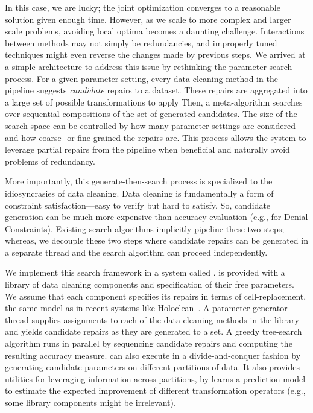 In this case, we are lucky; the joint optimization converges to a reasonable solution given enough time.
However, as we scale to more complex and larger scale problems, avoiding local optima becomes a daunting challenge.
Interactions between methods may not simply be redundancies, and improperly tuned techniques might even reverse the changes made by previous steps.
We arrived at a simple architecture to address this issue by rethinking the parameter search process.
For a given parameter setting, every data cleaning method in the pipeline suggests \emph{candidate} repairs to a dataset.
These repairs are aggregated into a large set of possible transformations to apply
Then, a meta-algorithm searches over sequential compositions of the set of generated candidates.
The size of the search space can be controlled by how many parameter settings are considered and how coarse- or fine-grained the repairs are.
This process allows the system to leverage partial repairs from the pipeline when beneficial and naturally avoid problems of redundancy.

More importantly, this generate-then-search process is specialized to the idiosyncrasies of data cleaning.
Data cleaning is fundamentally a form of constraint satisfaction---easy to verify but hard to satisfy.
So, candidate generation can be much more expensive than accuracy evaluation (e.g., for Denial Constraints).
Existing search algorithms implicitly pipeline these two steps; whereas, we decouple these two steps where candidate repairs can be generated in a separate thread and the search algorithm can proceed independently.


We implement this search framework in a system called \sys.
\sys is provided with a library of data cleaning components and specification of their free parameters. 
We assume that each component specifies its repairs in terms of cell-replacement, the same model as in recent systems like Holoclean~\cite{rekatsinas2017holoclean}.
A parameter generator thread supplies assignments to each of the data cleaning methods in the library and yields candidate repairs as they are generated to a set.
A greedy tree-search algorithm runs in parallel by sequencing candidate repairs and computing the resulting accuracy measure.
\sys can also execute in a divide-and-conquer fashion by generating candidate parameters on different partitions of data.
It also provides utilities for leveraging information across partitions, by learns a prediction model to estimate the expected improvement of different transformation operators (e.g., some library components might be irrelevant).  

